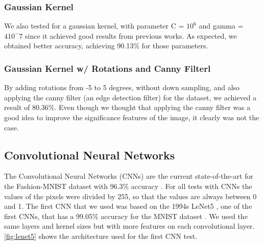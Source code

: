 \documentclass[twoside,twocolumn]{article}
\begin{document}
\subsubsection{Gaussian Kernel}

We also tested for a gaussian kernel, with parameter C = $10^6$ and gamma = $4 10^-7$ since it achieved good results from previous works.
As expected, we obtained better accuracy, achieving 90.13\% for those parameters.

\subsubsection{Gaussian Kernel w/ Rotations and Canny Filterl}

By adding rotations from -5 to 5 degrees, without down sampling, and also applying the canny filter (an edge detection filter)
for the dataset, we achieved a result of 80.36\%. Even though we thought that applying the canny filter was a good idea to improve
the significance features of the image, it clearly was not the case.

\subsection{Convolutional Neural Networks}

     The Convolutional Neural Networks (CNNs) are the current state-of-the-art for the Fashion-MNIST dataset with 96.3\% accuracy \cite{randomerasingdataaugmentationpaper}. For all tests with CNNs the values of the pixels were divided by 255, so that the values are always between 0 and 1. The first CNN that we used was based on the 1994s LeNet5 \cite{yannLeCun:1998}, one of the first CNNs, that has a 99.05\% accuracy for the MNIST dataset \cite{yannLeCun:mnist}. We used the same layers and kernel sizes but with more features on each convolutional layer. \ref{fig:lenet5} shows the architecture used for the first CNN test.
\end{document}
